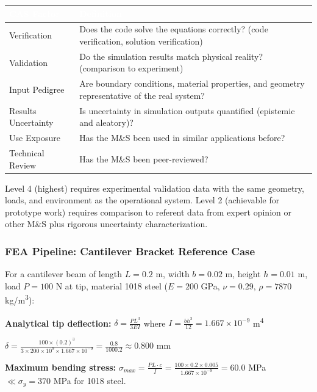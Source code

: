 \documentclass[11pt,letterpaper]{article}
\newcommand{\tableheader}[1]{\textbf{\sffamily\textcolor{white}{#1}}}
\begin{document}
\begin{center}
\begin{tabularx}{\textwidth}{L{3cm}X}
\toprule
{}
\tableheader{CAS Factor} & \tableheader{Definition} \\
\midrule
Verification & Does the code solve the equations correctly? (code verification, solution verification) \\
Validation & Do the simulation results match physical reality? (comparison to experiment) \\
Input Pedigree & Are boundary conditions, material properties, and geometry representative of the real system? \\
Results Uncertainty & Is uncertainty in simulation outputs quantified (epistemic and aleatory)? \\
Use Exposure & Has the M\&S been used in similar applications before? \\
Technical Review & Has the M\&S been peer-reviewed? \\
\bottomrule
\end{tabularx}
\end{center}

Level 4 (highest) requires experimental validation data with the same geometry, loads, and environment as the operational system. Level 2 (achievable for prototype work) requires comparison to referent data from expert opinion or other M\&S plus rigorous uncertainty characterization.

\subsubsection{FEA Pipeline: Cantilever Bracket Reference Case}

For a cantilever beam of length $L = 0.2$ m, width $b = 0.02$ m, height $h = 0.01$ m, load $P = 100$ N at tip, material 1018 steel ($E = 200$ GPa, $\nu = 0.29$, $\rho = 7870$ kg/m\textsuperscript{3}):

\textbf{Analytical tip deflection:} $\delta = \frac{PL^3}{3EI}$ where $I = \frac{bh^3}{12} = 1.667 \times 10^{-9}$ m\textsuperscript{4}

$\delta = \frac{100 \times (0.2)^3}{3 \times 200 \times 10^9 \times 1.667 \times 10^{-9}} = \frac{0.8}{1000.2} \approx 0.800$ mm

\textbf{Maximum bending stress:} $\sigma_{max} = \frac{PL \cdot c}{I} = \frac{100 \times 0.2 \times 0.005}{1.667 \times 10^{-9}} = 60.0$ MPa $\ll \sigma_y = 370$ MPa for 1018 steel.
\end{document}
